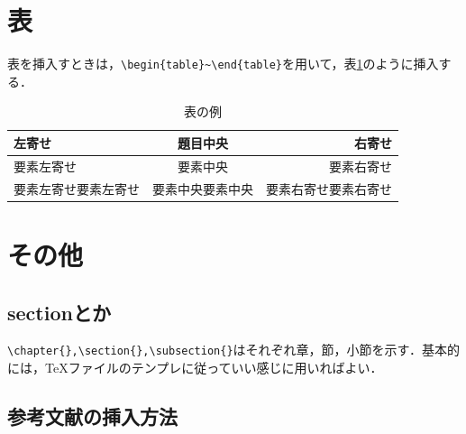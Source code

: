 \documentclass[11pt,a4paper]{jsarticle}
\begin{document}
\section{表}

表を挿入すときは，\verb|\begin{table}~\end{table}|を用いて，表\ref{tab:example-table}のように挿入する．

\begin{table}[htb]
  \centering %
  \caption{表の例} %
  \label{tab:example-table} %
  \begin{tabular}{lc|r} %
    左寄せ               & 題目中央         & 右寄せ               \\
    \hline %
    要素左寄せ           & 要素中央         & 要素右寄せ           \\
    要素左寄せ要素左寄せ & 要素中央要素中央 & 要素右寄せ要素右寄せ \\
  \end{tabular}
\end{table}

\section{その他}

\subsection{sectionとか}

\verb|\chapter{},\section{},\subsection{}|はそれぞれ章，節，小節を示す．基本的には，\TeX ファイルのテンプレに従っていい感じに用いればよい．

\subsection{参考文献の挿入方法}
\end{document}
